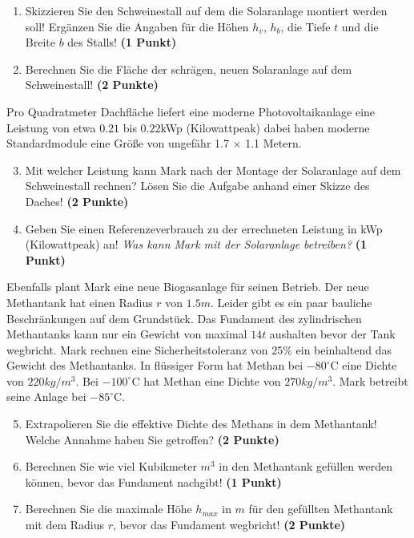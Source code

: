 \documentclass[a4paper, 9pt]{scrartcl}\usepackage[]{graphicx}\usepackage[]{xcolor}
\begin{document}
\begin{enumerate}
\item Skizzieren Sie den Schweinestall auf dem die Solaranlage montiert werden soll! Ergänzen Sie die Angaben für die Höhen $h_v$, $h_b$, die Tiefe $t$ und die Breite $b$ des Stalls!  \textbf{(1 Punkt)}
\item Berechnen Sie die Fläche der schrägen, neuen Solaranlage auf dem Schweinestall! \textbf{(2 Punkte)}
\end{enumerate}

Pro Quadratmeter Dachfläche liefert eine moderne Photovoltaikanlage eine Leistung von etwa $0.21$ bis $0.22$kWp (Kilowattpeak) dabei haben moderne Standardmodule eine Größe von ungefähr 1.7 $\times$ 1.1 Metern.

\begin{enumerate}
  \setcounter{enumi}{2}
\item Mit welcher Leistung kann Mark nach der Montage der Solaranlage auf dem Schweinestall rechnen? Lösen Sie die Aufgabe anhand einer Skizze des Daches! \textbf{(2 Punkte)}
\item Geben Sie einen Referenzeverbrauch zu der errechneten Leistung in kWp (Kilowattpeak) an! \textit{Was kann Mark mit der Solaranlage betreiben?} \textbf{(1 Punkt)}
\end{enumerate}

Ebenfalls plant Mark eine neue Biogasanlage für seinen Betrieb. Der neue Methantank hat einen Radius $r$ von $1.5m$. Leider gibt es ein paar bauliche Beschränkungen auf dem Grundstück. Das Fundament des zylindrischen Methantanks kann nur ein Gewicht von maximal $14t$ aushalten bevor der Tank wegbricht. Mark rechnen eine Sicherheitstoleranz von $25\%$ ein beinhaltend das Gewicht des Methantanks. In flüssiger Form hat Methan bei $-80^\circ\text{C}$ eine Dichte von $220kg/m^3$. Bei $-100^\circ\text{C}$ hat Methan eine Dichte von $270kg/m^3$. Mark betreibt seine Anlage bei $-85^\circ\text{C}$.

\begin{enumerate}
  \setcounter{enumi}{4}
\item Extrapolieren Sie die effektive Dichte des Methans in dem Methantank! Welche Annahme haben Sie getroffen? \textbf{(2 Punkte)}
\item Berechnen Sie wie viel Kubikmeter $m^3$ in den Methantank gefüllen werden können, bevor das Fundament nachgibt! \textbf{(1 Punkt)}
\item Berechnen Sie die maximale Höhe $h_{max}$ in $m$ für den gefüllten Methantank mit dem Radius $r$, bevor das Fundament wegbricht! \textbf{(2 Punkte)}
\end{enumerate}
\end{document}
